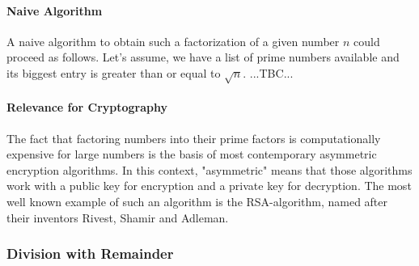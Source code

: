 

\paragraph{Naive Algorithm} A naive algorithm to obtain such a factorization of a given number $n$ could proceed as follows. Let's assume, we have a list of prime numbers available and its biggest entry is greater than or equal to $\sqrt{n}$. ...TBC...


\paragraph{Relevance for Cryptography} The fact that factoring numbers into their prime factors is computationally expensive for large numbers is the basis of most contemporary asymmetric encryption algorithms. In this context, "asymmetric" means that those algorithms work with a public key for encryption and a private key for decryption. The most well known example of such an algorithm is the RSA-algorithm, named after their inventors Rivest, Shamir and Adleman.






\subsubsection{Division with Remainder}
%
% 

